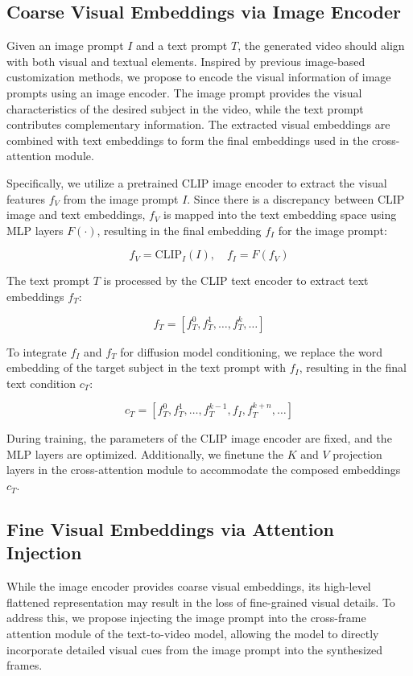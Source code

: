 \subsection{Coarse Visual Embeddings via Image Encoder}
Given an image prompt \(I\) and a text prompt \(T\), the generated video should align with both visual and textual elements. Inspired by previous image-based customization methods, we propose to encode the visual information of image prompts using an image encoder. The image prompt provides the visual characteristics of the desired subject in the video, while the text prompt contributes complementary information. The extracted visual embeddings are combined with text embeddings to form the final embeddings used in the cross-attention module.

Specifically, we utilize a pretrained CLIP image encoder to extract the visual features \(f_V\) from the image prompt \(I\). Since there is a discrepancy between CLIP image and text embeddings, \(f_V\) is mapped into the text embedding space using MLP layers \(F(\cdot)\), resulting in the final embedding \(f_I\) for the image prompt:

\[f_V = \text{CLIP}_I(I), \quad f_I = F(f_V)\]

The text prompt \(T\) is processed by the CLIP text encoder to extract text embeddings \(f_T\):

\[f_T = [f_T^0, f_T^1, \dots, f_T^k, \dots]\]

To integrate \(f_I\) and \(f_T\) for diffusion model conditioning, we replace the word embedding of the target subject in the text prompt with \(f_I\), resulting in the final text condition \(c_T\):

\[c_T = [f_T^0, f_T^1, \dots, f_T^{k-1}, f_I, f_T^{k+n}, \dots]\]

During training, the parameters of the CLIP image encoder are fixed, and the MLP layers are optimized. Additionally, we finetune the \(K\) and \(V\) projection layers in the cross-attention module to accommodate the composed embeddings \(c_T\).

\subsection{Fine Visual Embeddings via Attention Injection}
While the image encoder provides coarse visual embeddings, its high-level flattened representation may result in the loss of fine-grained visual details. To address this, we propose injecting the image prompt into the cross-frame attention module of the text-to-video model, allowing the model to directly incorporate detailed visual cues from the image prompt into the synthesized frames.


